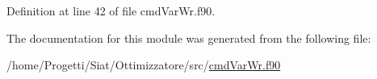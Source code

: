 Definition at line 42 of file cmd\-Var\-Wr.\-f90.



The documentation for this module was generated from the following file\-:\begin{DoxyCompactItemize}
\item 
/home/\-Progetti/\-Siat/\-Ottimizzatore/src/\hyperlink{cmd_var_wr_8f90}{cmd\-Var\-Wr.\-f90}\end{DoxyCompactItemize}
